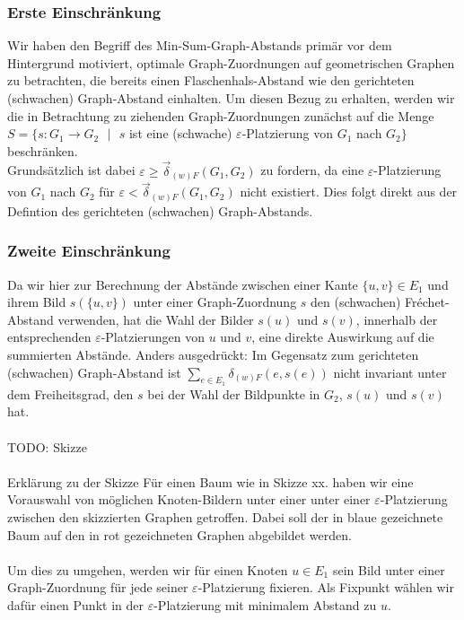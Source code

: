 \documentclass[a4paper, 12pt, twoside]{article}
\theoremstyle{Format1} %
\begin{document}
\subsubsection{Erste Einschränkung}
Wir haben den Begriff des Min-Sum-Graph-Abstands primär vor dem Hintergrund motiviert, optimale Graph-Zuordnungen auf geometrischen Graphen zu betrachten,
die bereits einen Flaschenhals-Abstand wie den gerichteten (schwachen) Graph-Abstand einhalten.
Um diesen Bezug zu erhalten, werden wir die in Betrachtung zu ziehenden Graph-Zuordnungen zunächst auf die Menge
$S = \{s: G_1 \to G_2 \text{ $|$ } s$ ist eine (schwache) $\varepsilon$-Platzierung von $G_1$ nach $G_2\}$ beschränken.
\\
Grundsätzlich ist dabei $\varepsilon \geq \vec{\delta}_{(w)F}(G_1, G_2)$ zu fordern, da eine $\varepsilon$-Platzierung von $G_1$ nach $G_2$ für $\varepsilon < \vec{\delta}_{(w)F}(G_1,G_2)$
nicht existiert. Dies folgt direkt aus der Defintion des gerichteten (schwachen) Graph-Abstands.
\\
\subsubsection{Zweite Einschränkung} \label {Zweite Einschränkung}
Da wir hier zur Berechnung der Abstände zwischen einer Kante $\{u,v\} \in E_1$ und ihrem Bild $s(\{u,v\})$ unter einer Graph-Zuordnung $s$ den (schwachen) Fréchet-Abstand verwenden,
hat die Wahl der Bilder $s(u)$ und $s(v)$, innerhalb der entsprechenden $\varepsilon$-Platzierungen von $u$ und $v$, eine direkte Auswirkung auf die summierten Abstände.
Anders ausgedrückt: Im Gegensatz zum gerichteten (schwachen) Graph-Abstand ist $\sum_{e \in E_1}\delta_{(w)F}(e, s(e))$ nicht invariant unter dem Freiheitsgrad, den $s$
bei der Wahl der Bildpunkte in $G_2$, $s(u)$ und $s(v)$ hat.
\\
\\
TODO: Skizze
\\
\\
Erklärung zu der Skizze
Für einen Baum wie in Skizze xx. haben wir eine Vorauswahl von möglichen Knoten-Bildern unter einer unter einer $\varepsilon$-Platzierung zwischen den skizzierten Graphen getroffen.
Dabei soll der in blaue gezeichnete Baum auf den in rot gezeichneten Graphen abgebildet werden.
\\
\\
Um dies zu umgehen, werden wir für einen Knoten $u \in E_1$ sein Bild unter einer Graph-Zuordnung für jede seiner $\varepsilon$-Platzierung fixieren.
Als Fixpunkt wählen wir dafür einen Punkt in der $\varepsilon$-Platzierung mit minimalem Abstand zu $u$.
\end{document}
